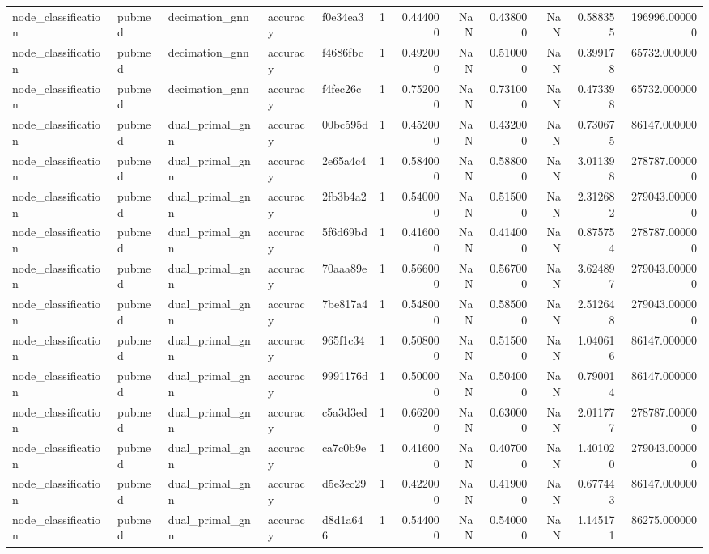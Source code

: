 \begin{tabular}{lllllrrrrrrr}
node_classification & pubmed & decimation_gnn & accuracy & f0e34ea3 & 1 & 0.444000 & NaN & 0.438000 & NaN & 0.588355 & 196996.000000 \\
node_classification & pubmed & decimation_gnn & accuracy & f4686fbc & 1 & 0.492000 & NaN & 0.510000 & NaN & 0.399178 & 65732.000000 \\
node_classification & pubmed & decimation_gnn & accuracy & f4fec26c & 1 & 0.752000 & NaN & 0.731000 & NaN & 0.473398 & 65732.000000 \\
node_classification & pubmed & dual_primal_gnn & accuracy & 00bc595d & 1 & 0.452000 & NaN & 0.432000 & NaN & 0.730675 & 86147.000000 \\
node_classification & pubmed & dual_primal_gnn & accuracy & 2e65a4c4 & 1 & 0.584000 & NaN & 0.588000 & NaN & 3.011398 & 278787.000000 \\
node_classification & pubmed & dual_primal_gnn & accuracy & 2fb3b4a2 & 1 & 0.540000 & NaN & 0.515000 & NaN & 2.312682 & 279043.000000 \\
node_classification & pubmed & dual_primal_gnn & accuracy & 5f6d69bd & 1 & 0.416000 & NaN & 0.414000 & NaN & 0.875754 & 278787.000000 \\
node_classification & pubmed & dual_primal_gnn & accuracy & 70aaa89e & 1 & 0.566000 & NaN & 0.567000 & NaN & 3.624897 & 279043.000000 \\
node_classification & pubmed & dual_primal_gnn & accuracy & 7be817a4 & 1 & 0.548000 & NaN & 0.585000 & NaN & 2.512648 & 279043.000000 \\
node_classification & pubmed & dual_primal_gnn & accuracy & 965f1c34 & 1 & 0.508000 & NaN & 0.515000 & NaN & 1.040616 & 86147.000000 \\
node_classification & pubmed & dual_primal_gnn & accuracy & 9991176d & 1 & 0.500000 & NaN & 0.504000 & NaN & 0.790014 & 86147.000000 \\
node_classification & pubmed & dual_primal_gnn & accuracy & c5a3d3ed & 1 & 0.662000 & NaN & 0.630000 & NaN & 2.011777 & 278787.000000 \\
node_classification & pubmed & dual_primal_gnn & accuracy & ca7c0b9e & 1 & 0.416000 & NaN & 0.407000 & NaN & 1.401020 & 279043.000000 \\
node_classification & pubmed & dual_primal_gnn & accuracy & d5e3ec29 & 1 & 0.422000 & NaN & 0.419000 & NaN & 0.677443 & 86147.000000 \\
node_classification & pubmed & dual_primal_gnn & accuracy & d8d1a646 & 1 & 0.544000 & NaN & 0.540000 & NaN & 1.145171 & 86275.000000 \\

\end{tabular}
